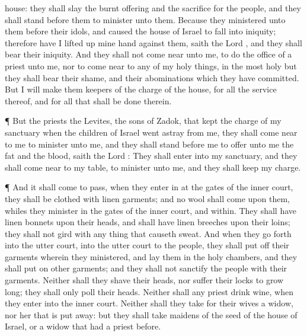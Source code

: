 {house: they shall
slay the burnt
offering and the
sacrifice for the
people, and they shall
stand
before them to
minister unto them.
Because they
ministered unto them
before their
idols, and caused the
house of
Israel to
fall into
iniquity; therefore have I lifted
up mine
hand against them,
saith the
Lord
{}, and they shall
bear their
iniquity.
And they shall not come
near unto me, to do the office of a
priest unto me, nor to come
near to any of my holy
things, in the most
holy
{} but they shall
bear their
shame, and their
abominations which they have
committed.
But I will
make them
keepers of the
charge of the
house, for all the
service thereof, and for all that shall be
done therein.
\par }{\PP {}¶ But the
priests the
Levites, the
sons of
Zadok, that
kept the
charge of my
sanctuary when the
children of
Israel went
astray from me, they shall come
near to me to
minister unto me, and they shall
stand
before me to
offer unto me the
fat and the
blood,
saith the
Lord
{}:
They shall
enter into my
sanctuary, and they shall come
near to my
table, to
minister unto me, and they shall
keep my
charge.
\par }{\PP {}¶ And it shall come to pass,
{} when they
enter in at the
gates of the
inner
court, they shall be
clothed with
linen
garments; and no
wool shall
come upon them, whiles they
minister in the
gates of the
inner
court, and
within.
They shall have
linen
bonnets upon their
heads, and shall have
linen
breeches upon their
loins; they shall not
gird
{} with any thing that causeth
sweat.
And when they go
forth into the
utter
court,
{} into the
utter
court to the
people, they shall put
off their
garments wherein they
ministered, and
lay them in the
holy
chambers, and they shall
put on
other
garments; and they shall not
sanctify the
people with their
garments.
Neither shall they
shave their
heads, nor suffer their
locks to grow
long; they shall
only
poll their
heads.
Neither shall any
priest
drink
wine, when they
enter into the
inner
court.
Neither shall they
take for their
wives a
widow, nor her that is put
away: but they shall
take
maidens of the
seed of the
house of
Israel, or a
widow that had a
priest before.
}
